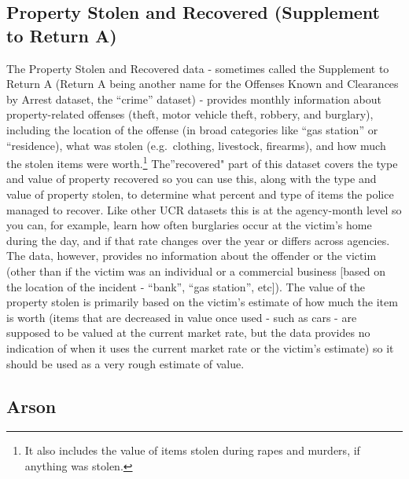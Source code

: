 \documentclass[
  12pt,
  openany]{book}
\begin{document}
\hypertarget{property-stolen-and-recovered-supplement-to-return-a}{%
\subsection{Property Stolen and Recovered (Supplement to Return A)}\label{property-stolen-and-recovered-supplement-to-return-a}}

The Property Stolen and Recovered data - sometimes called the Supplement to Return A (Return A being another name for the Offenses Known and Clearances by Arrest dataset, the ``crime'' dataset) - provides monthly information about property-related offenses (theft, motor vehicle theft, robbery, and burglary), including the location of the offense (in broad categories like ``gas station'' or ``residence), what was stolen (e.g.~clothing, livestock, firearms), and how much the stolen items were worth.\footnote{It also includes the value of items stolen during rapes and murders, if anything was stolen.} The''recovered" part of this dataset covers the type and value of property recovered so you can use this, along with the type and value of property stolen, to determine what percent and type of items the police managed to recover. Like other UCR datasets this is at the agency-month level so you can, for example, learn how often burglaries occur at the victim's home during the day, and if that rate changes over the year or differs across agencies. The data, however, provides no information about the offender or the victim (other than if the victim was an individual or a commercial business {[}based on the location of the incident - ``bank'', ``gas station'', etc{]}). The value of the property stolen is primarily based on the victim's estimate of how much the item is worth (items that are decreased in value once used - such as cars - are supposed to be valued at the current market rate, but the data provides no indication of when it uses the current market rate or the victim's estimate) so it should be used as a very rough estimate of value.

\hypertarget{arson}{%
\subsection{Arson}\label{arson}}
\end{document}

